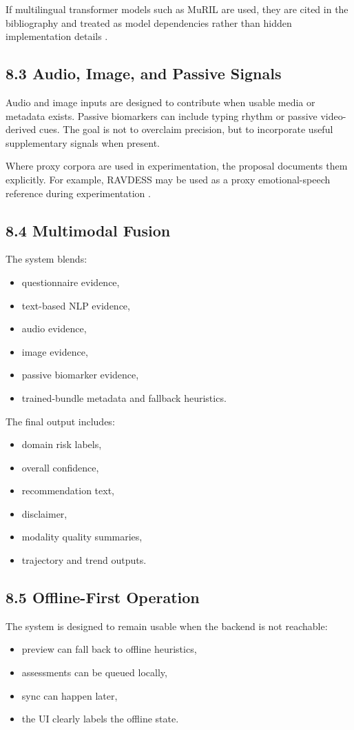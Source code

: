 \documentclass[11pt]{article}
\begin{document}
If multilingual transformer models such as MuRIL are used, they are cited in the bibliography and treated as model dependencies rather than hidden implementation details \citep{chi2021muril}.

\subsection{8.3 Audio, Image, and Passive Signals}
Audio and image inputs are designed to contribute when usable media or metadata exists. Passive biomarkers can include typing rhythm or passive video-derived cues. The goal is not to overclaim precision, but to incorporate useful supplementary signals when present.

Where proxy corpora are used in experimentation, the proposal documents them explicitly. For example, RAVDESS may be used as a proxy emotional-speech reference during experimentation \citep{livingstone2018ravdess}.

\subsection{8.4 Multimodal Fusion}
The system blends:
\begin{itemize}[leftmargin=*]
  \item questionnaire evidence,
  \item text-based NLP evidence,
  \item audio evidence,
  \item image evidence,
  \item passive biomarker evidence,
  \item trained-bundle metadata and fallback heuristics.
\end{itemize}

The final output includes:
\begin{itemize}[leftmargin=*]
  \item domain risk labels,
  \item overall confidence,
  \item recommendation text,
  \item disclaimer,
  \item modality quality summaries,
  \item trajectory and trend outputs.
\end{itemize}

\subsection{8.5 Offline-First Operation}
The system is designed to remain usable when the backend is not reachable:
\begin{itemize}[leftmargin=*]
  \item preview can fall back to offline heuristics,
  \item assessments can be queued locally,
  \item sync can happen later,
  \item the UI clearly labels the offline state.
\end{itemize}
\end{document}

